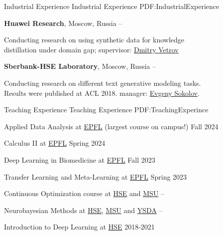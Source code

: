 \documentclass[letterpaper,MMMyyyy,nonstopmode]{simpleresumecv}
\begin{document}
\begin{Body}
\Section
{Industrial Experience}
{Industrial Experience}
{PDF:IndustrialExperience}

\Entry
\textbf{Huawei Research}, Moscow, Russia
\hfill
{} --
\begin{Detail}
Conducting research on using synthetic data for knowledge \\
distillation under domain gap; supervisor: \href{https://bayesgroup.ru/people/dmitry-vetrov/}{Dmitry Vetrov}
\end{Detail}
\Gap

\Entry
\textbf{Sberbank-HSE Laboratory}, Moscow, Russia
\hfill
{} --
\begin{Detail}
Conducting research on different text generative modeling tasks.\\
Results were published at ACL 2018. manager: \href{https://www.hse.ru/en/staff/esokolov}{Evgeny Sokolov}.
\end{Detail}


\Section
{Teaching Experience}
{Teaching Experience}
{PDF:TeachingExperince}

\Entry
Applied Data Analysis at \href{https://edu.epfl.ch/coursebook/en/applied-data-analysis-CS-401}{EPFL} (largest course on campus!)
\hfill
Fall 2024
\Gap

\Entry
Calculus II at \href{https://edu.epfl.ch/coursebook/en/analysis-ii-MATH-106-E}{EPFL}
\hfill
Spring 2024
\Gap

\Entry
Deep Learning in Biomedicine at \href{https://edu.epfl.ch/coursebook/en/deep-learning-in-biomedicine-CS-502}{EPFL}
\hfill
Fall 2023
\Gap

\Entry
Transfer Learning and Meta-Learning at \href{https://edu.epfl.ch/coursebook/en/transfer-learning-and-meta-learning-CS-625}{EPFL}
\hfill
Spring 2023
\Gap

\Entry
Continuous Optimization course at \href{https://cs.hse.ru/en/}{HSE} and \href{https://cs.msu.ru/en}{MSU}
\hfill
{} --
\Gap

\Entry
Neurobayesian Methods at \href{https://cs.hse.ru/en/}{HSE}, \href{https://cs.msu.ru/en}{MSU} and \href{https://yandexdataschool.com}{YSDA}
\hfill
{} --
\Gap

\Entry
Introduction to Deep Learning at \href{https://cs.hse.ru/en/}{HSE}
\hfill
2018-2021
\Gap


\end{Body}
\end{document}
